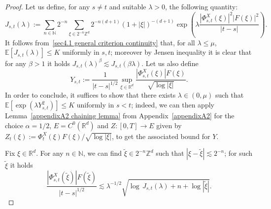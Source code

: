 \documentclass[10pt]{article}
\newcommand{\assign}{:=}
\begin{document}
\begin{proof}
  Let us define, for any $s \neq t$ and suitable $\lambda > 0$, the following
  quantity:
%  
  \begin{equation*}
    J_{s, t} (\lambda) \assign \sum_{n \in \mathbb{N}} 2^{- n} \sum_{\xi \in
    2^{- n} \mathbb{Z}^d} 2^{- n (d + 1)} (1 + | \xi |)^{- (d + 1)} \exp
    \left( \lambda \frac{| \Phi^X_{s, t} (\xi) |^2 | F (\xi) |^2}{| t - s |}
    \right) .
  \end{equation*}
%  
  It follows from~\eqref{sec4.1 general criterion continuity} that, for all
  $\lambda \leqslant \mu$, $\mathbb{E} [J_{s, t} (\lambda)] \leqslant K$
  uniformly in $s, t$; moreover by Jensen inequality it is clear that for any
  $\beta > 1$ it holds $J_{s, t} (\lambda)^{\beta} \lesssim J_{s, t} (\beta
  \lambda)$. Let us also define
  \[ Y_{s, t} \assign \frac{1}{| t - s |^{1 / 2}} \sup_{\xi \in \mathbb{R}^d}
     \frac{| \Phi^X_{s, t} (\xi) | F (\xi)}{\sqrt{\log | \xi |}} . \]
  In order to conclude, it suffices to show that there exists $\lambda \in (0,
  \mu)$ such that $\mathbb{E} [\exp (\lambda Y^2_{s, t})] \leqslant K$
  uniformly in $s < t$; indeed, we can then apply Lemma~\ref{appendixA2
  chaining lemma} from Appendix~\ref{appendixA2} for the choice $\alpha = 1 /
  2$, $E = C^0 (\mathbb{R}^d)$ and $Z : [0, T] \rightarrow E$ given by $Z_t
  (\xi) \assign \Phi^X_t (\xi) F (\xi) / \sqrt{\log | \xi |}$, to get the
  associated bound for $Y$.
  
  Fix $\xi \in \mathbb{R}^d$. For any $n \in \mathbb{N}$, we can find
  $\tilde{\xi} \in 2^{- n} \mathbb{Z}^d$ such that $| \xi - \tilde{\xi} |
  \lesssim 2^{- n}$; for such $\tilde{\xi}$ it holds
  \[ \frac{| \Phi_{s, t}^X (\tilde{\xi}) | F (\tilde{\xi})}{| t - s |^{1 / 2}}
     \lesssim \lambda^{- 1 / 2} \sqrt{\log \, J_{s, t} (\lambda) + n + \log |
     \tilde{\xi} |} . \]
  

\end{proof}
\end{document}
